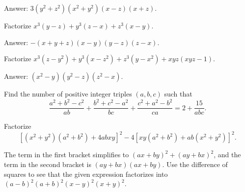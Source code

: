 \begin{solution}[name=Solution by Parviz Shahriari]
Answer: $3(y^2+z^2)(x^2+y^2)(x-z)(x+z)$.
\end{solution}


\begin{tcolorbox}
\begin{question}
Factorize $x^3(y-z) + y^3(z-x) + z^3(x-y)$.
\end{question}
\end{tcolorbox}

\begin{solution}[name=Solution by Parviz Shahriari]
Answer: $-(x+y+z)(x-y)(y-z)(z-x)$.
\end{solution}


\begin{tcolorbox}
\begin{question}
Factorize $x^3(z-y^2)+y^3(x-z^2)+z^3(y-x^2)+xyz(xyz-1)$.
\end{question}
\end{tcolorbox}

\begin{solution}[name=Solution by Parviz Shahriari]
Answer: $(x^2-y)(y^2-z)(z^2-x)$.
\end{solution}


\begin{question}[name={2006 Korea}]
    Find the number of positive integer triples $(a,b,c)$ such that
    \[\frac{a^2+b^2-c^2}{ab}+\frac{b^2+c^2-a^2}{bc}+\frac{c^2+a^2-b^2}{ca}=2+\frac{15}{abc}.\]
\end{question}



\begin{question}
Factorize \[[(x^2+y^2)(a^2+b^2)+4abxy]^2 - 4[xy(a^2+b^2)+ab(x^2+y^2)]^2.\]
\end{question}

\begin{solution}[name=Solution by Parviz Shahriari]
The term in the first bracket simplifies to $(ax+by)^2+(ay+bx)^2$, and the term in the second bracket is $(ay+bx)(ax+by)$. Use the difference of squares to see that the given expression factorizes into $(a-b)^2(a+b)^2(x-y)^2(x+y)^2$. 
\end{solution}



